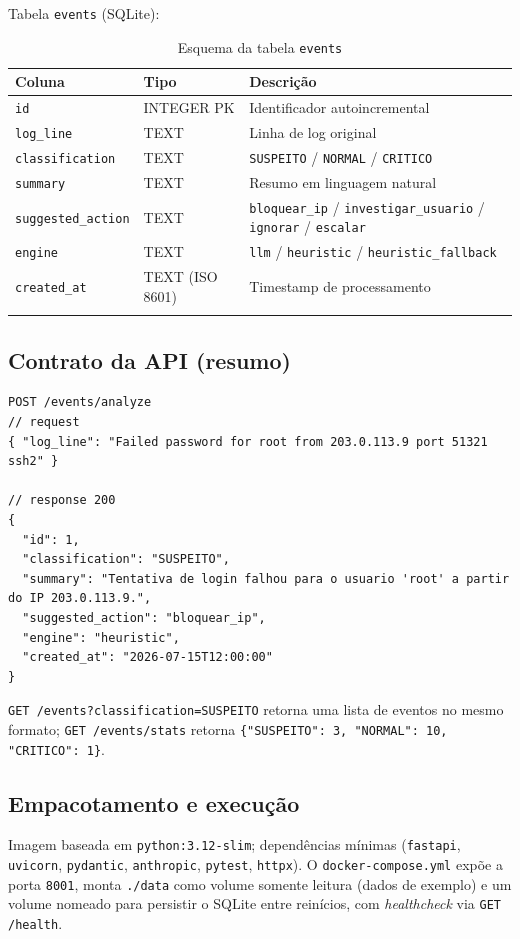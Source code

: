 \documentclass[11pt,a4paper]{article}
\begin{document}
Tabela \texttt{events} (SQLite):

\begin{longtable}{p{2.8cm}p{2.2cm}p{7.5cm}}
\toprule
\textbf{Coluna} & \textbf{Tipo} & \textbf{Descrição} \\
\midrule
\endhead
\texttt{id} & INTEGER PK & Identificador autoincremental \\
\texttt{log\_line} & TEXT & Linha de log original \\
\texttt{classification} & TEXT & \texttt{SUSPEITO} / \texttt{NORMAL} / \texttt{CRITICO} \\
\texttt{summary} & TEXT & Resumo em linguagem natural \\
\texttt{suggested\_action} & TEXT & \texttt{bloquear\_ip} / \texttt{investigar\_usuario} / \texttt{ignorar} / \texttt{escalar} \\
\texttt{engine} & TEXT & \texttt{llm} / \texttt{heuristic} / \texttt{heuristic\_fallback} \\
\texttt{created\_at} & TEXT (ISO 8601) & Timestamp de processamento \\
\bottomrule
\caption{Esquema da tabela \texttt{events}}
\end{longtable}

\subsection{Contrato da API (resumo)}

\begin{lstlisting}
POST /events/analyze
// request
{ "log_line": "Failed password for root from 203.0.113.9 port 51321 ssh2" }

// response 200
{
  "id": 1,
  "classification": "SUSPEITO",
  "summary": "Tentativa de login falhou para o usuario 'root' a partir do IP 203.0.113.9.",
  "suggested_action": "bloquear_ip",
  "engine": "heuristic",
  "created_at": "2026-07-15T12:00:00"
}
\end{lstlisting}

\texttt{GET /events?classification=SUSPEITO} retorna uma lista de eventos no mesmo
formato; \texttt{GET /events/stats} retorna
\texttt{\{"SUSPEITO": 3, "NORMAL": 10, "CRITICO": 1\}}.

\subsection{Empacotamento e execução}

Imagem baseada em \texttt{python:3.12-slim}; dependências mínimas
(\texttt{fastapi}, \texttt{uvicorn}, \texttt{pydantic}, \texttt{anthropic},
\texttt{pytest}, \texttt{httpx}). O \texttt{docker-compose.yml} expõe a porta
\texttt{8001}, monta \texttt{./data} como volume somente leitura (dados de exemplo) e
um volume nomeado para persistir o SQLite entre reinícios, com \emph{healthcheck} via
\texttt{GET /health}.
\end{document}
